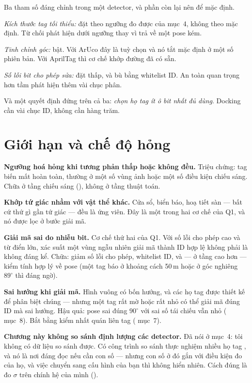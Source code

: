 \documentclass[../../marker.tex]{subfiles}
\begin{document}
\begin{cannho}
Ba tham số đáng chỉnh trong một detector, và phần còn lại nên để mặc định.

\emph{Kích thước tag tối thiểu:} đặt theo ngưỡng đo được của  mục~4, không theo mặc định. Từ chối phát hiện dưới ngưỡng thay vì trả về một pose kém.

\emph{Tinh chỉnh góc:} bật. Với ArUco đây là tuỳ chọn và nó tắt mặc định ở một số phiên bản. Với AprilTag thì cơ chế khớp đường đã có sẵn.

\emph{Số lỗi bit cho phép sửa:} đặt thấp, và bù bằng whitelist ID. An toàn quan trọng hơn tầm phát hiện thêm vài chục phân.

Và một quyết định đứng trên cả ba: \emph{chọn họ tag ít ô bit nhất đủ dùng}. Docking cần vài chục ID, không cần hàng trăm.
\end{cannho}

\section{Giới hạn và chế độ hỏng}

\textbf{Ngưỡng hoá hỏng khi tương phản thấp hoặc không đều.} Triệu chứng: tag biến mất hoàn toàn, thường ở một số vùng ảnh hoặc một số điều kiện chiếu sáng. Chữa ở tầng chiếu sáng (), không ở tầng thuật toán.

\textbf{Khớp tứ giác nhầm với vật thể khác.} Cửa sổ, biển báo, hoạ tiết sàn --- bất cứ thứ gì gần tứ giác --- đều là ứng viên. Đây là một trong hai cơ chế của Q1, và nó được lọc ở bước giải mã.

\textbf{Giải mã sai do nhiễu bit.} Cơ chế thứ hai của Q1. Với số lỗi cho phép cao và từ điển lớn, xác suất một vùng ngẫu nhiên giải mã thành ID hợp lệ không phải là không đáng kể. Chữa: giảm số lỗi cho phép, whitelist ID, và --- ở tầng cao hơn --- kiểm tính hợp lý về pose (một tag báo ở khoảng cách 50\,m hoặc ở góc nghiêng \(89^\circ\) thì đáng ngờ).

\textbf{Sai hướng khi giải mã.} Hình vuông có bốn hướng, và các họ tag được thiết kế để phân biệt chúng --- nhưng một tag rất mờ hoặc rất nhỏ có thể giải mã đúng ID mà sai hướng. Hậu quả: pose sai đúng \(90^\circ\) với sai số tái chiếu vẫn nhỏ ( mục~8). Bắt bằng kiểm nhất quán liên tag ( mục~7).

\textbf{Chương này không so sánh định lượng các detector.} Đã nói ở mục~4: tôi không có dữ liệu so sánh được. Có công trình so sánh thực nghiệm nhiều họ tag \cite{kalaitzakis2021fiducial}, và nó là nơi đáng đọc nếu cần con số --- nhưng con số ở đó gắn với điều kiện đo của họ, và việc chuyển sang cấu hình của bạn thì không hiển nhiên. Cách đúng là đo \(\sigma\) trên chính hệ của mình ().
\end{document}
